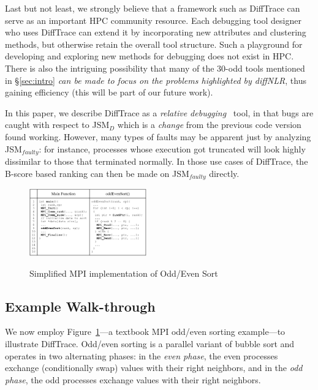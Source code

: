 Last but not least,
we strongly believe that a framework such as DiffTrace can
serve as an important HPC community resource.
%
Each debugging tool designer who uses DiffTrace can extend
it by incorporating new attributes and clustering methods, but
otherwise retain the overall tool structure.
%
Such a playground for developing and exploring new methods for
debugging does not exist in HPC.
%
There is also the intriguing possibility that 
many of the 30-odd tools mentioned in \S\ref{sec:intro}
{\em can be made to focus on the problems highlighted
  by diffNLR}, thus gaining efficiency (this will be part of our future work).


In this paper, we describe DiffTrace as a
{\em relative debugging}~\cite{relative-debugging}
tool, in that bugs are caught with respect
to JSM$_{D}$ which is a {\em change} from
the previous code version found working.
%
However, many types of faults may be apparent
just by analyzing JSM$_{faulty}$: for instance,
processes whose execution got truncated 
will look highly dissimilar to those that
terminated normally.
%
In those use cases of DiffTrace,
the B-score based ranking can then be made
on JSM$_{faulty}$ directly.





\begin{figure}[]
\centering
\caption{Simplified MPI implementation of Odd/Even Sort}
\includegraphics[width=0.45\textwidth]{figs/oddEven.png}
\label{fig.oddEven}
\end{figure}


\subsection{Example Walk-through}

We now employ
Figure~\ref{fig.oddEven}---a textbook MPI odd/even sorting example---to
illustrate DiffTrace.
%
Odd/even sorting is a parallel variant
of bubble sort
and operates in two alternating phases:
in the \textit{even phase}, the even processes exchange (conditionally swap)
values with their right neighbors, and in the \textit{odd phase},
the odd processes exchange values with their right neighbors.
%

